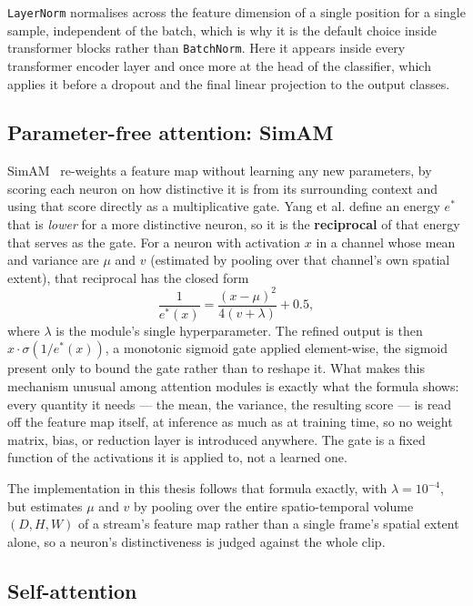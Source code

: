 \texttt{LayerNorm} normalises across the feature dimension of a single position for a single sample, independent of the batch, which is why it is the default choice inside transformer blocks rather than \texttt{BatchNorm}. Here it appears inside every transformer encoder layer and once more at the head of the classifier, which applies it before a dropout and the final linear projection to the output classes.

\subsection{Parameter-free attention: SimAM}
\label{sec:simam}

SimAM~\cite{yang2021} re-weights a feature map without learning any new parameters, by scoring each neuron on how distinctive it is from its surrounding context and using that score directly as a multiplicative gate. Yang et al. define an energy $e^{*}$ that is \textit{lower} for a more distinctive neuron, so it is the \textbf{reciprocal} of that energy that serves as the gate. For a neuron with activation $x$ in a channel whose mean and variance are $\mu$ and $v$ (estimated by pooling over that channel's own spatial extent), that reciprocal has the closed form
\[
	\frac{1}{e^{*}(x)} = \frac{(x-\mu)^2}{4(v+\lambda)} + 0.5,
\]
where $\lambda$ is the module's single hyperparameter. The refined output is then $x \cdot \sigma\!\left(1/e^{*}(x)\right)$, a monotonic sigmoid gate applied element-wise, the sigmoid present only to bound the gate rather than to reshape it. What makes this mechanism unusual among attention modules is exactly what the formula shows: every quantity it needs --- the mean, the variance, the resulting score --- is read off the feature map itself, at inference as much as at training time, so no weight matrix, bias, or reduction layer is introduced anywhere. The gate is a fixed function of the activations it is applied to, not a learned one.

The implementation in this thesis follows that formula exactly, with $\lambda = 10^{-4}$, but estimates $\mu$ and $v$ by pooling over the entire spatio-temporal volume $(D, H, W)$ of a stream's feature map rather than a single frame's spatial extent alone, so a neuron's distinctiveness is judged against the whole clip.

\subsection{Self-attention}
\label{sec:self-attention}


